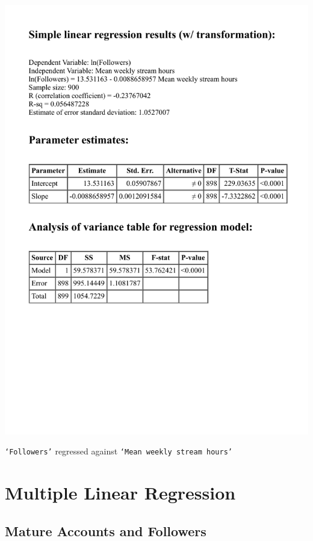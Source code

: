 \documentclass[12pt]{article}
\begin{document}
\begin{table}[H]
\centering
  \includegraphics[height=0.5\textheight]{../StatCrunch_Results/ln_followers_stream/table}
  \captionsetup{justification=centering, singlelinecheck=false, margin=2cm}
  \caption[Simple Linear Regression for Followers by Stream Time]{\texttt{`Followers'} regressed against \texttt{`Mean weekly stream hours'}}
  \label{tab:ln_followers_stream}
\end{table}

\section{Multiple Linear Regression}

\subsection{Mature Accounts and Followers}\
\end{document}
